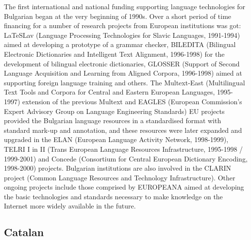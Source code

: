 \documentclass[10pt, plain]{../../metanetpaper}
\begin{document}
\begin{multicols}{2}
\begin{small}
The first international and national funding supporting language technologies for Bulgarian began at the very beginning of 1990s. Over a short period of time financing for a number of research projects from European institutions was got: LaTeSLav (Language Processing Technologies for Slavic Languages, 1991-1994) aimed at developing a prototype of a grammar checker, BILEDITA (Bilingual Electronic Dictionaries and Intelligent Text Alignment, 1996-1998) for the development of bilingual electronic dictionaries, GLOSSER (Support of Second Language Acquisition and Learning from Aligned Corpora, 1996-1998) aimed at supporting foreign language training and others. The Multext-East (Multilingual Text Tools and Corpora for Central and Eastern European Languages, 1995-1997) extension of the previous Multext and EAGLES (European Commission’s Expert Advisory Group on Language Engineering Standards) EU projects provided the Bulgarian language resources in a standardised format with standard mark-up and annotation, and these resources were later expanded and upgraded in the ELAN (European Language Activity Network, 1998-1999), TELRI I in II (Trans European Language Resources Infrastructure, 1995-1998 / 1999-2001) and Concede (Consortium for Central European Dictionary Encoding, 1998-2000) projects. Bulgarian institutions are also involved in the CLARIN project (Common Language Resources and Technology Infrastructure). Other ongoing projects include those comprised by EUROPEANA aimed at developing the basic technologies and standards necessary to make knowledge on the Internet more widely available in the future.

\subsection*{Catalan}
\label{sec:catalan}


\end{small}
\end{multicols}
\end{document}
